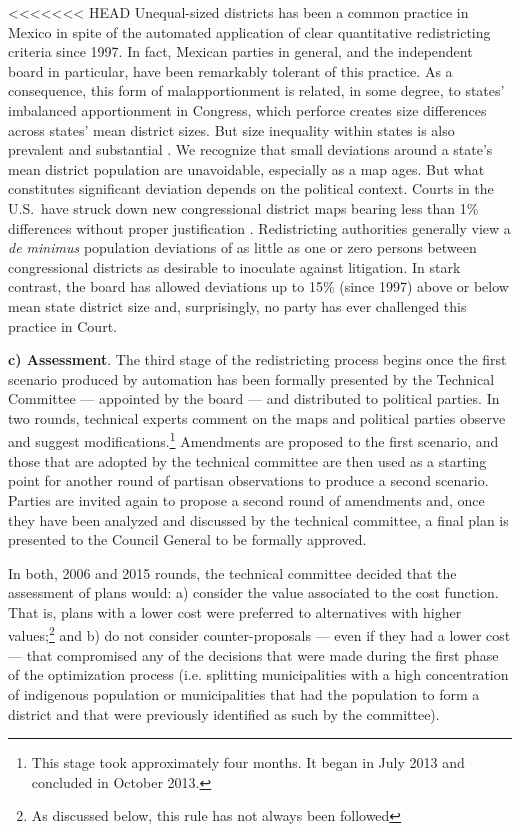 \documentclass[letter,12pt]{article}
\begin{document}
<<<<<<< HEAD
Unequal-sized districts has been a common practice in Mexico in spite of the automated application of clear quantitative redistricting criteria since 1997. In fact, Mexican parties in general, and the independent board in particular, have been remarkably tolerant of this practice. As a consequence, this form of malapportionment is related, in some degree, to states' imbalanced apportionment in Congress, which perforce creates size differences across states' mean district sizes. But size inequality within states is also prevalent and substantial \citep{magar.etalBiasMultiParty2015}. We recognize that small deviations around a state's mean district population are unavoidable, especially as a map ages. But what constitutes significant deviation depends on the political context. Courts in the U.S.\ have struck down new congressional district maps bearing less than 1\% differences without proper justification \citep{tuckerApportionment.1985}. Redistricting authorities generally view a \emph{de minimus} population deviations of as little as one or zero persons between congressional districts as desirable to inoculate against litigation. In stark contrast, the board has allowed deviations up to 15\% (since 1997) above or below mean state district size \citep{lujambio.vives.2008,trelles.mtz.polygob2012} and, surprisingly, no party has ever challenged this practice in Court. 

\textbf{c) Assessment}. The third stage of the redistricting process begins once the first scenario produced by automation has been formally presented by the Technical Committee --- appointed by the board --- and distributed to political parties. In two rounds, technical experts comment on the maps and political parties observe and suggest modifications.\footnote{This stage took approximately four months. It began in July 2013 and concluded in October 2013.} Amendments are proposed to the first scenario, and those that are adopted by the technical committee are then used as a starting point for another round of partisan observations to produce a second scenario. Parties are invited again to propose a second round of amendments and, once they have been analyzed and discussed by the technical committee, a final plan is presented to the Council General to be formally approved. 

In both, 2006 and 2015 rounds, the technical committee decided that the assessment of plans would: a) consider the value associated to the cost function. That is, plans with a lower cost were preferred to alternatives with higher values;\footnote{As discussed below, this rule has not always been followed} and b) do not consider counter-proposals --- even if they had a lower cost --- that compromised any of the decisions that were made during the first phase of the optimization process (i.e. splitting municipalities with a high concentration of indigenous population or municipalities that had the population to form a district and that were previously identified as such by the committee).  
\end{document}
